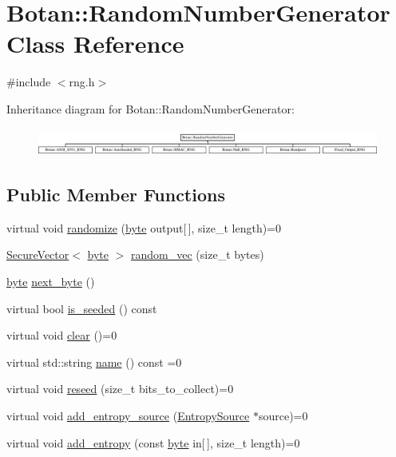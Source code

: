 \hypertarget{classBotan_1_1RandomNumberGenerator}{\section{Botan\-:\-:Random\-Number\-Generator Class Reference}
\label{classBotan_1_1RandomNumberGenerator}
}


{\ttfamily \#include $<$rng.\-h$>$}

Inheritance diagram for Botan\-:\-:Random\-Number\-Generator\-:\begin{figure}[H]
\begin{center}
\leavevmode
\includegraphics[height=0.915033cm]{classBotan_1_1RandomNumberGenerator}
\end{center}
\end{figure}
\subsection*{Public Member Functions}
\begin{DoxyCompactItemize}
\item 
virtual void \hyperlink{classBotan_1_1RandomNumberGenerator_a844a0607c33ec0580c93f06477e978fa}{randomize} (\hyperlink{namespaceBotan_a7d793989d801281df48c6b19616b8b84}{byte} output\mbox{[}$\,$\mbox{]}, size\-\_\-t length)=0
\item 
\hyperlink{classBotan_1_1SecureVector}{Secure\-Vector}$<$ \hyperlink{namespaceBotan_a7d793989d801281df48c6b19616b8b84}{byte} $>$ \hyperlink{classBotan_1_1RandomNumberGenerator_a12d7264ebbb7130c9a1045bb7a13c177}{random\-\_\-vec} (size\-\_\-t bytes)
\item 
\hyperlink{namespaceBotan_a7d793989d801281df48c6b19616b8b84}{byte} \hyperlink{classBotan_1_1RandomNumberGenerator_a1cf6df774886ca0039bee80ad6ff88d6}{next\-\_\-byte} ()
\item 
virtual bool \hyperlink{classBotan_1_1RandomNumberGenerator_aa9fe8a7a46a50cb94068bb449801008d}{is\-\_\-seeded} () const 
\item 
virtual void \hyperlink{classBotan_1_1RandomNumberGenerator_a2aae6710baf18b5f1b1d59ad2597a3d3}{clear} ()=0
\item 
virtual std\-::string \hyperlink{classBotan_1_1RandomNumberGenerator_a9a6085d55e0d36b311fa4c18a5c07ea0}{name} () const =0
\item 
virtual void \hyperlink{classBotan_1_1RandomNumberGenerator_a2d4e91943829d64593ee4ce4251fd57b}{reseed} (size\-\_\-t bits\-\_\-to\-\_\-collect)=0
\item 
virtual void \hyperlink{classBotan_1_1RandomNumberGenerator_a4346c3e7ba316e7434d94e91919ee43e}{add\-\_\-entropy\-\_\-source} (\hyperlink{classBotan_1_1EntropySource}{Entropy\-Source} $\ast$source)=0
\item 
virtual void \hyperlink{classBotan_1_1RandomNumberGenerator_a92557ce6b709a0cf6a154b6f27844a6e}{add\-\_\-entropy} (const \hyperlink{namespaceBotan_a7d793989d801281df48c6b19616b8b84}{byte} in\mbox{[}$\,$\mbox{]}, size\-\_\-t length)=0
\end{DoxyCompactItemize}
